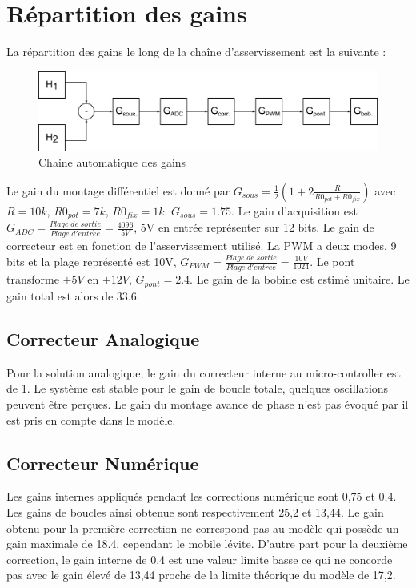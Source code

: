 \documentclass[11pt, french]{article} %
\begin{document}
\section{Répartition des gains}
La répartition des gains le long de la chaîne d'asservissement est la suivante :
\begin{figure}[h!]
	\centering
	\includegraphics[width = 16cm]{SolutionNumerique/Gain.png} 
	\caption{Chaine automatique des gains}
\end{figure}

Le gain du montage différentiel est donné par $G_{sous}=\frac{1}{2}\left( 1+2 \frac{R}{R0_{pot}+R0_{fix}}\right)$ avec $R=10k$, $R0_{pot}=7k$, $R0_{fix}=1k$. $G_{sous}=1.75$.
Le gain d'acquisition est $G_{ADC}= \frac{Plage \; de \; sortie}{Plage \; d'entr \acute{e} e}=\frac{4096}{5V}$, 5V en entrée représenter sur 12 bits. 
Le gain de correcteur est en fonction de l'asservissement utilisé.
La PWM a deux modes, 9 bits et la plage représenté est 10V, $G_{PWM}= \frac{Plage \; de \; sortie}{Plage \; d'entr \acute{e} e}=\frac{10V}{1024}$.
Le pont transforme $\pm5V$ en $\pm12V$, $G_{pont}=2.4$.
Le gain de la bobine est estimé unitaire. Le gain total est alors de $33.6$.

\subsection{Correcteur Analogique}
Pour la solution analogique, le gain du correcteur interne au micro-controller est de 1. Le système est stable pour le gain de boucle totale, quelques oscillations peuvent être perçues. Le gain du montage avance de phase n'est pas évoqué par il est pris en compte dans le modèle.
\subsection{Correcteur Numérique}
Les gains internes appliqués pendant les corrections numérique sont 0,75 et 0,4. Les gains de boucles ainsi obtenue sont respectivement 25,2 et 13,44. Le gain obtenu pour la première correction ne correspond pas au modèle qui possède un gain maximale de 18.4, cependant le mobile lévite. D'autre part pour la deuxième correction, le gain interne de 0.4 est une valeur limite basse ce qui ne concorde pas avec le gain élevé de 13,44 proche de la limite théorique du modèle de 17,2.
\end{document}
